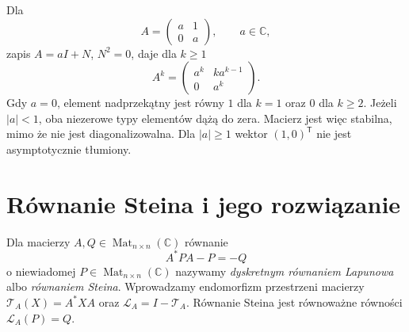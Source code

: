 \begin{przyklad}
\label{prz:lin23-jordan}
Dla
\[
 A=\begin{pmatrix}a&1\\0&a\end{pmatrix},
 \qquad a\in\mathbb C,
\]
zapis \(A=aI+N\), \(N^2=0\),
daje dla \(k\ge1\)
\[
 A^k=\begin{pmatrix}
 a^k&ka^{k-1}\\0&a^k
 \end{pmatrix}.
\]
Gdy \(a=0\), element nadprzekątny
jest równy \(1\) dla \(k=1\)
oraz \(0\) dla \(k\ge2\).
Jeżeli \(|a|<1\), oba niezerowe
typy elementów dążą do zera.
Macierz jest więc stabilna,
mimo że nie jest diagonalizowalna.
Dla \(|a|\ge1\)
wektor \((1,0)^{\mathsf T}\)
nie jest asymptotycznie tłumiony.
\end{przyklad}

\section{Równanie Steina i jego rozwiązanie}
\label{sec:lin23-stein}

\begin{definicja}
\label{def:lin23-stein}
Dla macierzy
\(A,Q\in\operatorname{Mat}_{n\times n}(\mathbb C)\)
równanie
\[
 A^*PA-P=-Q
\]
o niewiadomej
\(P\in\operatorname{Mat}_{n\times n}(\mathbb C)\)
nazywamy \emph{dyskretnym
równaniem Lapunowa}
albo \emph{równaniem Steina}.
Wprowadzamy endomorfizm przestrzeni
macierzy
\(\mathcal T_A(X)=A^*XA\)
oraz \(\mathcal L_A=I-\mathcal T_A\).
Równanie Steina jest równoważne
równości \(\mathcal L_A(P)=Q\).
\end{definicja}

